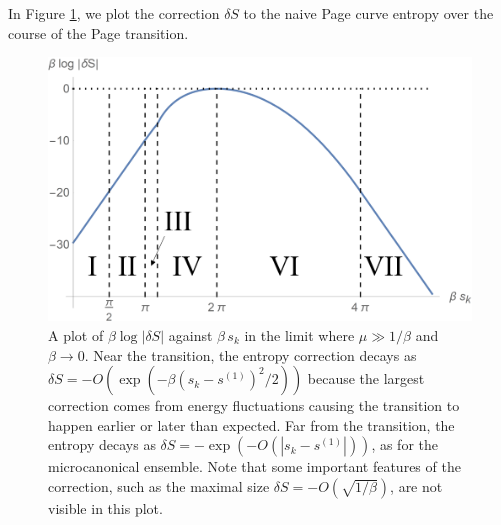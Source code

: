 \documentclass[12pt]{article}
\newcommand{\smax}{s_k}
\numberwithin{equation}{section}
\begin{document}
In Figure \ref{fig:deltaS}, we plot the correction $\delta S$ to the naive Page curve entropy over the course of the Page transition.
\begin{figure}[t]
\includegraphics[width = 0.7\linewidth]{images/EntropyCorrectionsLabelled.png}
\centering
\caption{A plot of $\beta \log |\delta S|$ against $\beta\, \smax$ in the limit where $\mu \gg 1/\beta$ and $\beta \to 0$. Near the transition, the entropy correction decays as $\delta S = -O(\exp(-\beta(\smax - s^{(1)})^2/2))$ because the largest correction comes from energy fluctuations causing the transition to happen earlier or later than expected. Far from the transition, the entropy decays as $\delta S = -\exp(-O(|\smax - s^{(1)}|))$, as for the microcanonical ensemble. Note that some important features of the correction, such as the maximal size $\delta S = -O(\sqrt{1/\beta})$, are not visible in this plot.}
\label{fig:deltaS}
\end{figure} 
\end{document}
